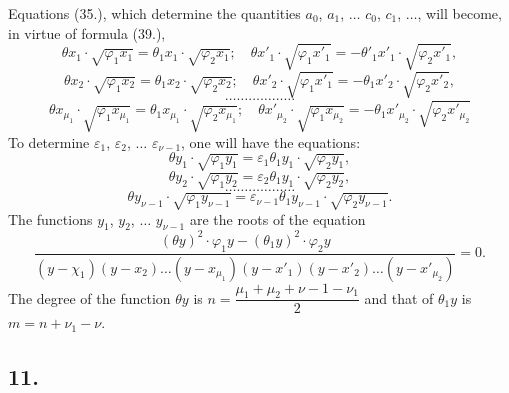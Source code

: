 \documentclass{article}
\begin{document}
Equations (35.), which determine the quantities $a_0$, $a_1$, $\ldots$ $c_0$, $c_1$, $\ldots$, will become, in virtue of formula (39.),
\[ \theta x_1 \cdot \sqrt{\varphi_1 x_1} = \theta_1 x_1 \cdot \sqrt{\varphi_2 x_1}; \quad \theta x'_1 \cdot \sqrt{\varphi_1 x'_1} = -\theta'_1 x'_1 \cdot \sqrt{\varphi_2 x'_1}, \tag{40} \]
\[ \theta x_2 \cdot \sqrt{\varphi_1 x_2} = \theta_1 x_2 \cdot \sqrt{\varphi_2 x_2}; \quad \theta x'_2 \cdot \sqrt{\varphi_1 x'_1} = -\theta_1 x'_2 \cdot \sqrt{\varphi_2 x'_2}, \]
\[ \ldots\ldots\ldots\ldots\ldots\ldots \]
\[ \theta x_{\mu_1} \cdot \sqrt{\varphi_1 x_{\mu_1}} = \theta_1 x_{\mu_1} \cdot \sqrt{\varphi_2 x_{\mu_1}}; \quad \theta x'_{\mu_2} \cdot \sqrt{\varphi_1 x_{\mu_2}} = -\theta_1 x'_{\mu_2} \cdot \sqrt{\varphi_2 x'_{\mu_2}} \]
To determine $\varepsilon_1$, $\varepsilon_2$, $\ldots$ $\varepsilon_{\nu-1}$, one will have the equations:
\[ \theta y_1 \cdot \sqrt{\varphi_1 y_1} = \varepsilon_1\theta_1 y_1 \cdot \sqrt{\varphi_2 y_1}, \tag{41} \]
\[ \theta y_2 \cdot \sqrt{\varphi_1 y_2} = \varepsilon_2\theta_1 y_1 \cdot \sqrt{\varphi_2 y_2}, \]
\[ \ldots\ldots\ldots\ldots\ldots\ldots \]
\[ \theta y_{\nu-1} \cdot \sqrt{\varphi_1 y_{\nu-1}} = \varepsilon_{\nu-1}\theta_1 y_{\nu-1} \cdot \sqrt{\varphi_2 y_{\nu-1}}. \]
The functions $y_1$, $y_2$, $\ldots$ $y_{\nu-1}$ are the roots of the equation
\[ \frac{(\theta y)^{2} \cdot \varphi_1 y-(\theta_1 y)^{2} \cdot \varphi_2 y}{(y-\chi_1)(y-x_2)\ldots(y-x_{\mu_1})(y-x'_1)(y-x'_2)\ldots(y-x'_{\mu_2})} = 0. \tag{42} \]
The degree of the function $\theta y$ is $n = \dfrac{\mu_1+\mu_2+\nu-1-\nu_1}{2}$ and that of $\theta_1 y$ is $m = n+\nu_1-\nu$.
\subsection*{11.}
\end{document}
